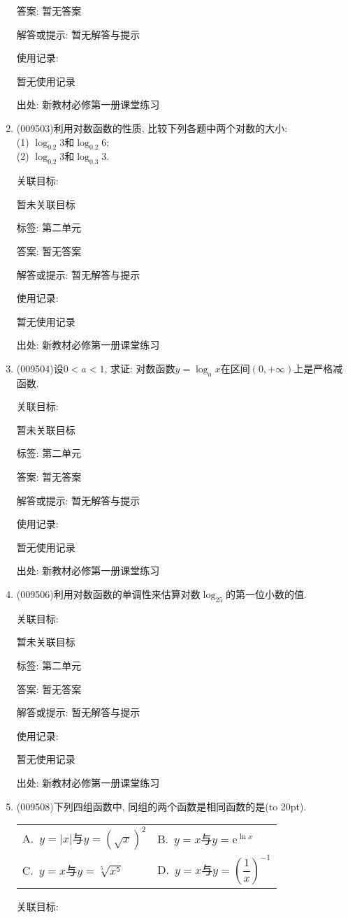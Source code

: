 \documentclass[10pt,a4paper]{article}
\newcommand{\bracket}[1]{(\hbox to #1pt{})}
\newcommand{\twoch}[4]{\par\begin{tabular}{p{.46\textwidth}p{.46\textwidth}}
A.~#1& B.~#2\\
C.~#3& D.~#4
\end{tabular}}
\begin{document}
\begin{enumerate}[1.]
答案: 暂无答案

解答或提示: 暂无解答与提示

使用记录:

暂无使用记录


出处: 新教材必修第一册课堂练习
\item { (009503)}利用对数函数的性质, 比较下列各题中两个对数的大小:\\
(1) $\log_{0.2}3$和$\log_{0.2}6$;\\
(2) $\log_{0.2}3$和$\log_{0.3}3$.


关联目标:

暂未关联目标



标签: 第二单元

答案: 暂无答案

解答或提示: 暂无解答与提示

使用记录:

暂无使用记录


出处: 新教材必修第一册课堂练习
\item { (009504)}设$0<a<1$, 求证: 对数函数$y=\log_ax$在区间$(0, +\infty)$上是严格减函数.


关联目标:

暂未关联目标



标签: 第二单元

答案: 暂无答案

解答或提示: 暂无解答与提示

使用记录:

暂无使用记录


出处: 新教材必修第一册课堂练习
\item { (009506)}利用对数函数的单调性来估算对数$\log_25$的第一位小数的值.


关联目标:

暂未关联目标



标签: 第二单元

答案: 暂无答案

解答或提示: 暂无解答与提示

使用记录:

暂无使用记录


出处: 新教材必修第一册课堂练习
\item { (009508)}下列四组函数中, 同组的两个函数是相同函数的是\bracket{20}.
\twoch{$y=|x|$与$y=(\sqrt x)^2$}{$y=x$与$y=\mathrm{e}^{\ln x}$}{$y=x$与$y=\sqrt[5]{x^5}$}{$y=x$与$y=(\dfrac 1x)^{-1}$}


关联目标:


\end{enumerate}
\end{document}
